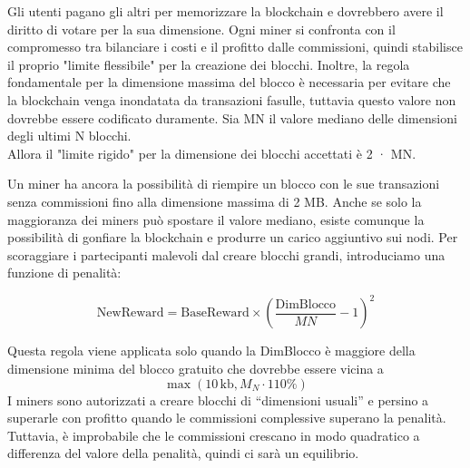 Gli utenti pagano gli altri per memorizzare la blockchain e dovrebbero
avere il diritto di votare per la sua dimensione. Ogni miner si
confronta con il compromesso tra bilanciare i costi e il profitto dalle
commissioni, quindi stabilisce il proprio "limite flessibile" per la
creazione dei blocchi. Inoltre, la regola fondamentale per la dimensione
massima del blocco è necessaria per evitare che la blockchain venga
inondatata da transazioni fasulle, tuttavia questo valore non dovrebbe
essere codificato duramente. Sia MN il valore mediano delle dimensioni
degli ultimi N blocchi.\\
Allora il "limite rigido" per la dimensione dei blocchi accettati è 2 ·
MN.

Un miner ha ancora la possibilità di riempire un blocco con le sue
transazioni senza commissioni fino alla dimensione massima di 2 MB.
Anche se solo la maggioranza dei miners può spostare il valore mediano,
esiste comunque la possibilità di gonfiare la blockchain e produrre un
carico aggiuntivo sui nodi. Per scoraggiare i partecipanti malevoli dal
creare blocchi grandi, introduciamo una funzione di penalità:

\[
\text{NewReward} = \text{BaseReward} \times \left( \frac{\text{DimBlocco}}{MN} - 1 \right)^2
\]

Questa regola viene applicata solo quando la DimBlocco è maggiore della
dimensione minima del blocco gratuito che dovrebbe essere vicina a \[
\max(10\, \text{kb}, M_N \cdot 110\%) \] I miners sono autorizzati a
creare blocchi di ``dimensioni usuali'' e persino a superarle con
profitto quando le commissioni complessive superano la penalità.\\
Tuttavia, è improbabile che le commissioni crescano in modo quadratico a
differenza del valore della penalità, quindi ci sarà un equilibrio.
